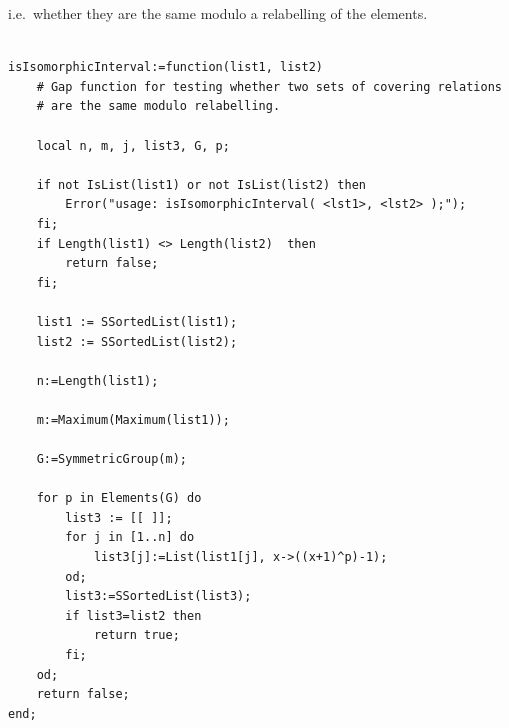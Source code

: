 \documentclass[11pt]{amsart}
\theoremstyle{plain}
\newcommand{\codesize}{\footnotesize}
\newcommand{\<}{\ensuremath{\langle}}
\renewcommand{\>}{\ensuremath{\rangle}}
\begin{document}
i.e.~whether they are the same modulo a relabelling of the elements.
{\codesize
\begin{verbatim}

isIsomorphicInterval:=function(list1, list2)
    # Gap function for testing whether two sets of covering relations 
    # are the same modulo relabelling. 
    
    local n, m, j, list3, G, p;
    
    if not IsList(list1) or not IsList(list2) then
        Error("usage: isIsomorphicInterval( <lst1>, <lst2> );");
    fi;
    if Length(list1) <> Length(list2)  then
        return false;
    fi;
        
    list1 := SSortedList(list1);
    list2 := SSortedList(list2);

    n:=Length(list1);
    
    m:=Maximum(Maximum(list1));
  
    G:=SymmetricGroup(m);
    
    for p in Elements(G) do
        list3 := [[ ]];
        for j in [1..n] do
            list3[j]:=List(list1[j], x->((x+1)^p)-1); 
        od;
        list3:=SSortedList(list3);
        if list3=list2 then
            return true;
        fi;
    od;
    return false;
end;

\end{verbatim}}



\end{document}
